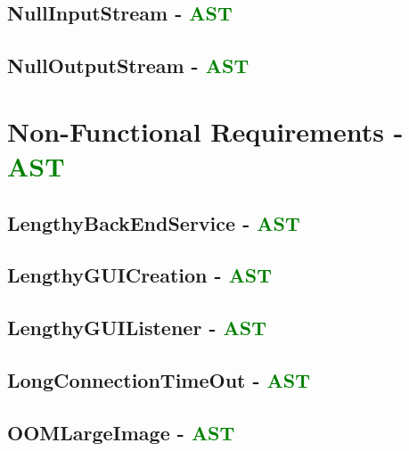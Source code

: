 \subsection{NullInputStream - \textcolor{green}{AST}}
\subsection{NullOutputStream - \textcolor{green}{AST}}

\section{Non-Functional Requirements - \textcolor{green}{AST}}
\subsection{LengthyBackEndService - \textcolor{green}{AST}}
\subsection{LengthyGUICreation - \textcolor{green}{AST}}
\subsection{LengthyGUIListener - \textcolor{green}{AST}}
\subsection{LongConnectionTimeOut - \textcolor{green}{AST}}
\subsection{OOMLargeImage - \textcolor{green}{AST}}